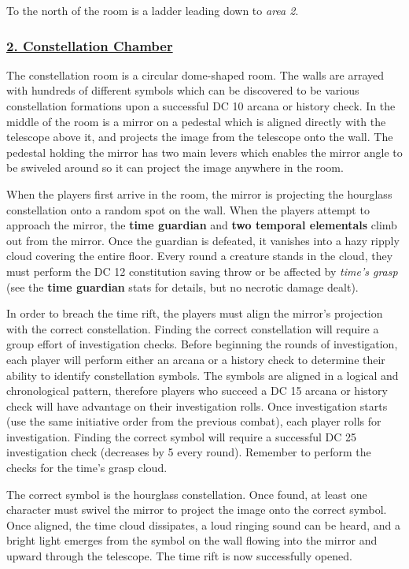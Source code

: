 \documentclass{article}
\begin{document}
\begin{multicols*}{2}
	To the north of the room is a ladder leading down to \emph{area 2}.
	
	\subsubsection*{\underline{2. Constellation Chamber}}
	The constellation room is a circular dome-shaped room. The walls are arrayed with hundreds of different symbols which can be discovered to be various constellation formations upon a successful DC 10 arcana or history check. In the middle of the room is a mirror on a pedestal which is aligned directly with the telescope above it, and projects the image from the telescope onto the wall. The pedestal holding the mirror has two main levers which enables the mirror angle to be swiveled around so it can project  the image anywhere in the room.
	
	When the players first arrive in the room, the mirror is projecting the hourglass constellation onto a random spot on the wall. When the players attempt to approach the mirror, the \textbf{time guardian} and  \textbf{two temporal elementals} climb out from the mirror. Once the guardian is defeated, it vanishes into a hazy ripply cloud covering the entire floor. Every round a creature stands in the cloud, they must perform the DC 12 constitution saving throw or be affected by \emph{time's grasp} (see the \textbf{time guardian} stats for details, but no necrotic damage dealt).
	
	In order to breach the time rift, the players must align the mirror's projection with the correct constellation. Finding the correct constellation will require a group effort of investigation checks. Before beginning the rounds of investigation, each player will perform either an arcana or a history check to determine their ability to identify constellation symbols. The symbols are aligned in a logical and chronological pattern, therefore players who succeed a DC 15 arcana or history check will have advantage on their investigation rolls. Once investigation starts (use the same initiative order from the previous combat), each player rolls for investigation. Finding the correct symbol will require a successful DC 25 investigation check (decreases by 5 every round). Remember to perform the checks for the time's grasp cloud.
	 
	The correct symbol is the hourglass constellation. Once found, at least one character must swivel the mirror to project the image onto the correct symbol. Once aligned, the time cloud dissipates, a loud ringing sound can be heard, and a bright light emerges from the symbol on the wall flowing into the mirror and upward through the telescope. The time rift is now successfully opened.
	

\end{multicols*}
\end{document}
